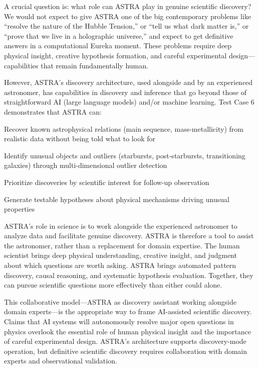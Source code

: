 \documentclass[usenatbib]{rasti}
\begin{document}
A crucial question is: what role can ASTRA play in genuine scientific discovery? We would not expect to give ASTRA one of the big contemporary problems like ``resolve the nature of the Hubble Tension,'' or ``tell us what dark matter is,'' or ``prove that we live in a holographic universe,'' and expect to get definitive answers in a computational Eureka moment. These problems require deep physical insight, creative hypothesis formation, and careful experimental design---capabilities that remain fundamentally human.

However, ASTRA's discovery architecture, used alongside and by an experienced astronomer, has capabilities in discovery and inference that go beyond those of straightforward AI (large language models) and/or machine learning. Test Case 6 demonstrates that ASTRA can:
\begin{description}
\item Recover known astrophysical relations (main sequence, mass-metallicity) from realistic data without being told what to look for
\item Identify unusual objects and outliers (starbursts, post-starbursts, transitioning galaxies) through multi-dimensional outlier detection
\item Prioritize discoveries by scientific interest for follow-up observation
\item Generate testable hypotheses about physical mechanisms driving unusual properties
\end{description}

ASTRA's role in science is to work alongside the experienced astronomer to analyze data and facilitate genuine discovery. ASTRA is therefore a tool to assist the astronomer, rather than a replacement for domain expertise. The human scientist brings deep physical understanding, creative insight, and judgment about which questions are worth asking. ASTRA brings automated pattern discovery, causal reasoning, and systematic hypothesis evaluation. Together, they can pursue scientific questions more effectively than either could alone.

This collaborative model---ASTRA as discovery assistant working alongside domain experts---is the appropriate way to frame AI-assisted scientific discovery. Claims that AI systems will autonomously resolve major open questions in physics overlook the essential role of human physical insight and the importance of careful experimental design. ASTRA's architecture supports discovery-mode operation, but definitive scientific discovery requires collaboration with domain experts and observational validation.
\end{document}
